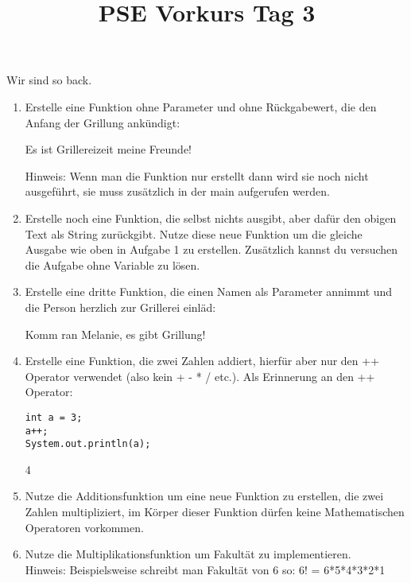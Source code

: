 \documentclass{../../sheet}
\title{PSE Vorkurs Tag 3}
\begin{document}
\maketitle
Wir sind so back.

\newpage


\begin{enumerate}
    \item Erstelle eine Funktion ohne Parameter und ohne Rückgabewert, die den Anfang der Grillung ankündigt:
          \begin{ausgabe}
              Es ist Grillereizeit meine Freunde!
          \end{ausgabe}
          Hinweis: Wenn man die Funktion nur erstellt dann wird sie noch nicht ausgeführt, sie muss zusätzlich in der main aufgerufen werden.
    \item Erstelle noch eine Funktion, die selbst nichts ausgibt, aber dafür den obigen Text als String zurückgibt. Nutze diese neue Funktion um die gleiche Ausgabe wie oben in Aufgabe 1 zu erstellen. Zusätzlich kannst du versuchen die Aufgabe ohne Variable zu lösen.
    \item Erstelle eine dritte Funktion, die einen Namen als Parameter annimmt und die Person herzlich zur Grillerei einläd:
          \begin{ausgabe}
              Komm ran Melanie, es gibt Grillung!
          \end{ausgabe}
    \item Erstelle eine Funktion, die zwei Zahlen addiert, hierfür aber nur den ++ Operator verwendet (also kein + - * / etc.). Als Erinnerung an den ++ Operator:
          \begin{verbatim}
int a = 3;
a++;
System.out.println(a);
    \end{verbatim}
          \begin{ausgabe}
              4
          \end{ausgabe}
    \item Nutze die Additionsfunktion um eine neue Funktion zu erstellen, die zwei Zahlen multipliziert, im Körper dieser Funktion dürfen keine Mathematischen Operatoren vorkommen.
    \item Nutze die Multiplikationsfunktion um Fakultät zu implementieren.\\
          Hinweis: Beispielsweise schreibt man Fakultät von 6 so: 6! = 6*5*4*3*2*1
\end{enumerate}
\end{document}
